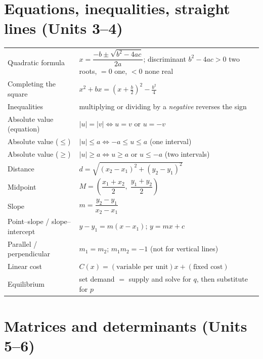 \section{Equations, inequalities, straight lines (Units 3--4)}

\begin{center}
\small
\begin{tabular}{@{}L{5.0cm} L{10.6cm}@{}}
\toprule
Quadratic formula & $x=\dfrac{-b\pm\sqrt{b^{2}-4ac}}{2a}$; discriminant
$b^{2}-4ac>0$ two roots, $=0$ one, $<0$ none real \\
Completing the square & $x^{2}+bx=\left(x+\tfrac b2\right)^{2}-\tfrac{b^{2}}{4}$ \\
Inequalities & multiplying or dividing by a \emph{negative} reverses the sign \\
Absolute value (equation) & $|u|=|v| \iff u=v$ or $u=-v$ \\
Absolute value ($\le$) & $|u|\le a \iff -a\le u\le a$ \quad (one interval) \\
Absolute value ($\ge$) & $|u|\ge a \iff u\ge a$ or $u\le -a$ \quad (two intervals) \\
Distance & $d=\sqrt{(x_2-x_1)^{2}+(y_2-y_1)^{2}}$ \\
Midpoint & $M=\left(\dfrac{x_1+x_2}{2},\;\dfrac{y_1+y_2}{2}\right)$ \\
Slope & $m=\dfrac{y_2-y_1}{x_2-x_1}$ \\
Point--slope / slope--intercept & $y-y_1=m(x-x_1)$; \quad $y=mx+c$ \\
Parallel / perpendicular & $m_1=m_2$; \quad $m_1m_2=-1$ (not for vertical lines) \\
Linear cost & $C(x)=(\text{variable per unit})x+(\text{fixed cost})$ \\
Equilibrium & set demand $=$ supply and solve for $q$, then substitute for $p$ \\
\bottomrule
\end{tabular}
\end{center}

\section{Matrices and determinants (Units 5--6)}

